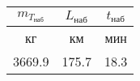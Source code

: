 \begin{tabular}{|c|c|c|}
\hline
$m_{T_{наб}}$ & $L_{наб}$ & $t_{наб}$ \\ 
\hline
кг & км & мин \\ 
\hline
3669.9 & 175.7 & 18.3 \\ 
\hline
\end{tabular}